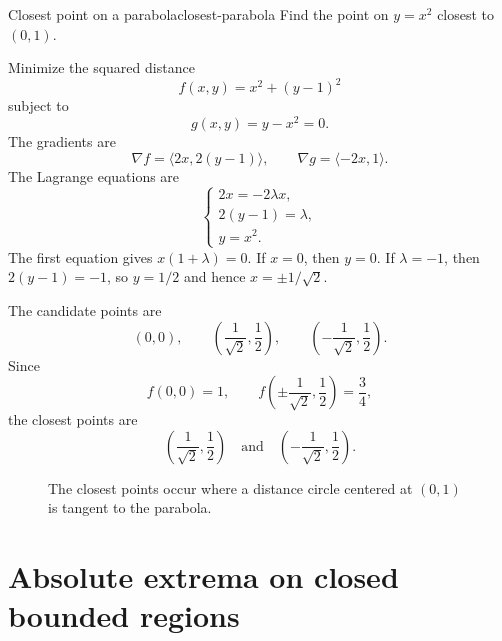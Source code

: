 \documentclass[11pt]{article}
\newcommand{\grad}{\nabla}
\begin{document}
\begin{workedexample}{Closest point on a parabola}{closest-parabola}
Find the point on $y=x^2$ closest to $(0,1)$.

Minimize the squared distance
\[
f(x,y)=x^2+(y-1)^2
\]
subject to
\[
g(x,y)=y-x^2=0.
\]
The gradients are
\[
\grad f=\langle 2x,2(y-1)\rangle,
\qquad
\grad g=\langle -2x,1\rangle.
\]
The Lagrange equations are
\[
\begin{cases}
2x=-2\lambda x,\\
2(y-1)=\lambda,\\
y=x^2.
\end{cases}
\]
The first equation gives $x(1+\lambda)=0$. If $x=0$, then $y=0$. If $\lambda=-1$, then $2(y-1)=-1$, so $y=1/2$ and hence $x=\pm 1/\sqrt2$.

The candidate points are
\[
(0,0),\qquad \left(\frac1{\sqrt2},\frac12\right),\qquad \left(-\frac1{\sqrt2},\frac12\right).
\]
Since
\[
f(0,0)=1,
\qquad
f\left(\pm\frac1{\sqrt2},\frac12\right)=\frac34,
\]
the closest points are
\[
\left(\frac1{\sqrt2},\frac12\right)
\quad\text{and}\quad
\left(-\frac1{\sqrt2},\frac12\right).
\]
\end{workedexample}

\begin{figure}[H]
\centering
{}
\caption{The closest points occur where a distance circle centered at $(0,1)$ is tangent to the parabola.}
\end{figure}

\section{Absolute extrema on closed bounded regions}
\end{document}
